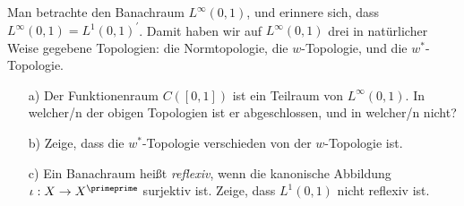 \begin{exercise}
Man betrachte den Banachraum $L^{\infty}(0,1)$, und erinnere sich, dass
$L^{\infty}(0,1) = L^1(0,1)^{\prime}$. Damit haben wir auf $L^{\infty}(0,1)$ drei
in natürlicher Weise gegebene Topologien: die Normtopologie, die $w$-Topologie,
und die $w^*$-Topologie.
\begin{itemize}
  \item [a)] Der Funktionenraum $C([0,1])$ ist ein Teilraum von $L^{\infty}(0,1)$.
  In welcher/n der obigen Topologien ist er abgeschlossen, und in welcher/n nicht?
  \item [b)] Zeige, dass die $w^*$-Topologie verschieden von der $w$-Topologie ist.
  \item [c)] Ein Banachraum heißt \textit{reflexiv}, wenn die kanonische Abbildung
  $\iota: X \rightarrow X^{\primeprime}$ surjektiv ist. Zeige, dass $L^1(0,1)$ nicht
  reflexiv ist.
\end{itemize}

\end{exercise}

